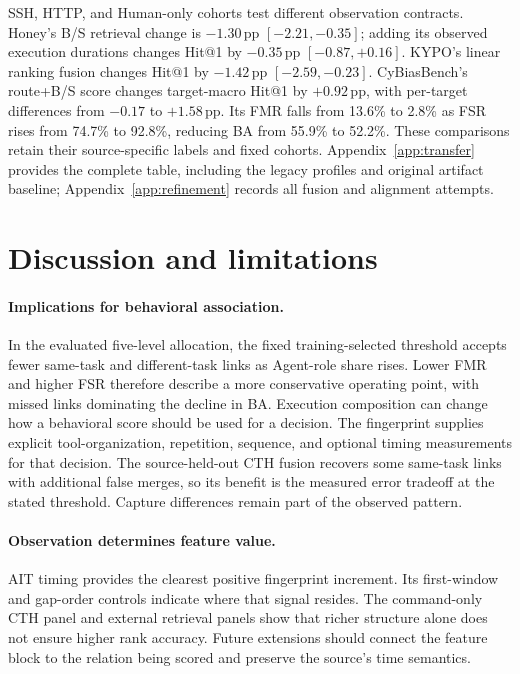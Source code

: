 \documentclass[10pt]{article}
\newcommand{\pp}{\,\mathrm{pp}}
\begin{document}
SSH, HTTP, and Human-only cohorts test different observation contracts. Honey's B/S retrieval change is $-1.30\pp$ $[-2.21,-0.35]$; adding its observed execution durations changes Hit@1 by $-0.35\pp$ $[-0.87,+0.16]$. KYPO's linear ranking fusion changes Hit@1 by $-1.42\pp$ $[-2.59,-0.23]$. CyBiasBench's route+B/S score changes target-macro Hit@1 by $+0.92\pp$, with per-target differences from $-0.17$ to $+1.58\pp$. Its FMR falls from 13.6\% to 2.8\% as FSR rises from 74.7\% to 92.8\%, reducing BA from 55.9\% to 52.2\%. These comparisons retain their source-specific labels and fixed cohorts. Appendix~\ref{app:transfer} provides the complete table, including the legacy profiles and original artifact baseline; Appendix~\ref{app:refinement} records all fusion and alignment attempts.

\section{Discussion and limitations}
\paragraph{Implications for behavioral association.} In the evaluated five-level allocation, the fixed training-selected threshold accepts fewer same-task and different-task links as Agent-role share rises. Lower FMR and higher FSR therefore describe a more conservative operating point, with missed links dominating the decline in BA. Execution composition can change how a behavioral score should be used for a decision. The fingerprint supplies explicit tool-organization, repetition, sequence, and optional timing measurements for that decision. The source-held-out CTH fusion recovers some same-task links with additional false merges, so its benefit is the measured error tradeoff at the stated threshold. Capture differences remain part of the observed pattern.

\paragraph{Observation determines feature value.} AIT timing provides the clearest positive fingerprint increment. Its first-window and gap-order controls indicate where that signal resides. The command-only CTH panel and external retrieval panels show that richer structure alone does not ensure higher rank accuracy. Future extensions should connect the feature block to the relation being scored and preserve the source's time semantics.
\end{document}
